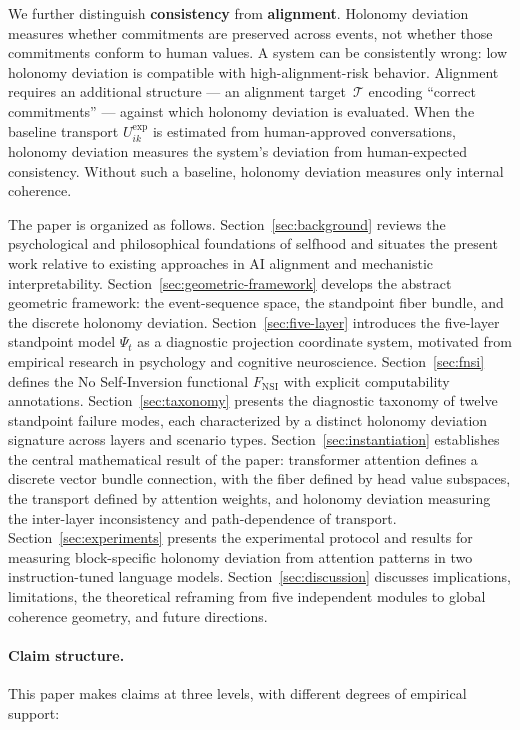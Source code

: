 We further distinguish \textbf{consistency} from \textbf{alignment}. Holonomy deviation measures
whether commitments are preserved across events, not whether those commitments conform to
human values. A system can be consistently wrong: low holonomy deviation is compatible with
high-alignment-risk behavior. Alignment requires an additional structure --- an alignment
target~$\mathcal{T}$ encoding ``correct commitments'' --- against which holonomy deviation is
evaluated. When the baseline transport $U_{ik}^{\exp}$ is estimated from human-approved
conversations, holonomy deviation measures the system's deviation from human-expected consistency.
Without such a baseline, holonomy deviation measures only internal coherence.

The paper is organized as follows. Section~\ref{sec:background} reviews the psychological and philosophical foundations of selfhood and situates the present work relative to existing approaches in AI alignment and mechanistic interpretability. Section~\ref{sec:geometric-framework} develops the abstract geometric framework: the event-sequence space, the standpoint fiber bundle, and the discrete holonomy deviation. Section~\ref{sec:five-layer} introduces the five-layer standpoint model $\Psi_t$ as a diagnostic projection coordinate system, motivated from empirical research in psychology and cognitive neuroscience. Section~\ref{sec:fnsi} defines the No Self-Inversion functional $F_{\mathrm{NSI}}$ with explicit computability annotations. Section~\ref{sec:taxonomy} presents the diagnostic taxonomy of twelve standpoint failure modes, each characterized by a distinct holonomy deviation signature across layers and scenario types. Section~\ref{sec:instantiation} establishes the central mathematical result of the paper: transformer attention defines a discrete vector bundle connection, with the fiber defined by head value subspaces, the transport defined by attention weights, and holonomy deviation measuring the inter-layer inconsistency and path-dependence of transport. Section~\ref{sec:experiments} presents the experimental protocol and results for measuring block-specific holonomy deviation from attention patterns in two instruction-tuned language models. Section~\ref{sec:discussion} discusses implications, limitations, the theoretical reframing from five independent modules to global coherence geometry, and future directions.

\paragraph{Claim structure.}
This paper makes claims at three levels, with different degrees of empirical support:

